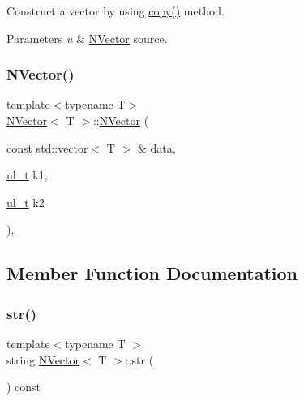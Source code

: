 Construct a vector by using {\ttfamily \mbox{\hyperlink{class_n_vector_a67128d2ff536b8ccd7a95cb680bd0431}{copy()}}} method. 


\begin{DoxyParams}{Parameters}
{\em u} & {\ttfamily \mbox{\hyperlink{class_n_vector}{N\+Vector}}} source. \\
\hline
\end{DoxyParams}
\mbox{\label{class_n_vector_a402111a5a467efd5741e6a17fbd5c903}} 
\subsubsection{\texorpdfstring{NVector()}{NVector()}\hspace{0.1cm}{\footnotesize\ttfamily [5/5]}}
{\footnotesize\ttfamily template$<$typename T$>$ \\
\mbox{\hyperlink{class_n_vector}{N\+Vector}}$<$ T $>$\+::\mbox{\hyperlink{class_n_vector}{N\+Vector}} (\begin{DoxyParamCaption}\item[{const std\+::vector$<$ T $>$ \&}]{data,  }\item[{\mbox{\hyperlink{typedef_8h_a1b140a2034db3f5dfe18a987745df43a}{ul\+\_\+t}}}]{k1,  }\item[{\mbox{\hyperlink{typedef_8h_a1b140a2034db3f5dfe18a987745df43a}{ul\+\_\+t}}}]{k2 }\end{DoxyParamCaption})\hspace{0.3cm}{\ttfamily [explicit]}, {\ttfamily [protected]}}



\subsection{Member Function Documentation}
\mbox{\label{class_n_vector_a6d66b06b953197c1b3965ed69f9fd17e}} 
\subsubsection{\texorpdfstring{str()}{str()}}
{\footnotesize\ttfamily template$<$typename T $>$ \\
string \mbox{\hyperlink{class_n_vector}{N\+Vector}}$<$ T $>$\+::str (\begin{DoxyParamCaption}{ }\end{DoxyParamCaption}) const\hspace{0.3cm}{\ttfamily [virtual]}}



